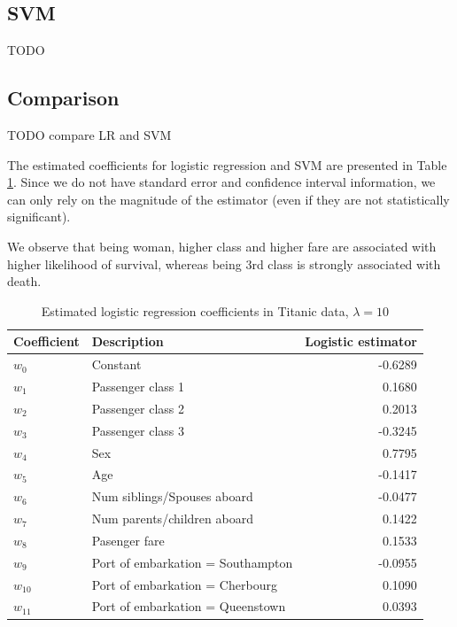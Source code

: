 \subsection{SVM}
TODO

\subsection{Comparison}
TODO compare LR and SVM

The estimated coefficients for logistic regression and SVM are presented in Table \ref{tab:titanic_coeff}. Since we do not have standard error and confidence interval information, we can only rely on the magnitude of the estimator (even if they are not statistically significant). 

We observe that being woman, higher class and higher fare are associated with higher likelihood of survival, whereas being 3rd class is strongly associated with death. 

\begin{table}[h!]
\centering
\caption{Estimated logistic regression coefficients in Titanic data, $\lambda = 10$}
\begin{tabular}{llr}
	\hline 
	Coefficient & Description & Logistic estimator \\
  \hline
  $w_0$  & Constant &-0.6289 \\
  $w_1$ 	& Passenger class 1 & 0.1680\\
  $w_2$ 	& Passenger class 2	  & 0.2013\\
  $w_3$  & Passenger class 3 & -0.3245\\
  $w_4$ 	 & Sex & 0.7795\\
  $w_5$ 	 & Age & -0.1417\\
  $w_6$ 	 & Num siblings/Spouses aboard & -0.0477 \\
  $w_7$ 	 & Num parents/children aboard & 0.1422\\
  $w_8$ 	 & Pasenger fare & 0.1533\\
  $w_9$ 	 & Port of embarkation = Southampton & -0.0955\\
  $w_{10}$  & Port of embarkation = Cherbourg & 0.1090\\
  $w_{11}$ & Port of embarkation = Queenstown	& 0.0393	\\
  \hline
\end{tabular}\label{tab:titanic_coeff}
\end{table}




